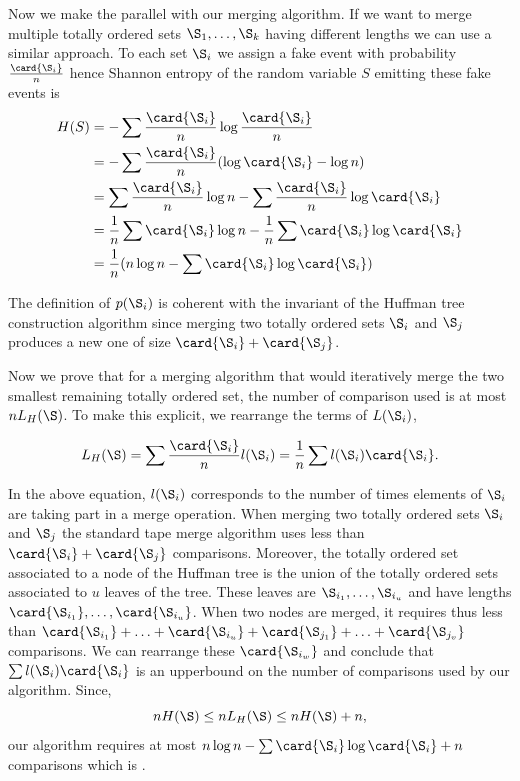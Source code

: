 Now we make the parallel with our merging algorithm. If we want to merge
multiple totally ordered sets \(\S_1,\ldots,\S_k\) having different lengths we can use a similar
approach. To each set \(\S_i\) we assign a fake event with probability
\(\frac{\card{\S_i}}{n}\) hence Shannon entropy of the random variable
\(S\) emitting these fake events is
\begin{align}
H(S) &= - \sum \frac{\card{\S_i}}{n} \log \frac{\card{\S_i}}{n}\\
&= - \sum \frac{\card{\S_i}}{n} (\log \card{\S_i} - \log n)\\
&= \sum \frac{\card{\S_i}}{n} \log n - \sum \frac{\card{\S_i}}{n} \log \card{\S_i}\\
&= \frac{1}{n} \sum \card{\S_i} \log n - \frac{1}{n} \sum \card{\S_i} \log
\card{\S_i}\\
&= \frac{1}{n} (n \log n - \sum \card{\S_i} \log \card{\S_i})\\
\end{align}

The definition of \(p(\S_i)\) is coherent with the invariant of
the Huffman tree construction algorithm since merging two totally ordered sets
\(\S_i\) and \(\S_j\) produces a new one of size \(\card{\S_i} + \card{\S_j}\).

Now we prove that for a merging algorithm that would iteratively merge the two
smallest remaining totally ordered set, the number of comparison used is at
most \(n L_H(\S)\). To make this explicit, we rearrange the terms of \(L(\S_i)\),

\begin{displaymath}
L_H(\S) = \sum \frac{\card{\S_i}}{n} l(\S_i) = \frac{1}{n} \sum l(\S_i) \card{\S_i}.
\end{displaymath}

In the above equation, \(l(\S_i)\) corresponds to the number of times elements
of \(\S_i\) are taking part in a merge operation. When merging two totally
ordered sets \(\S_i\) and \(\S_j\) the standard tape merge algorithm uses less
than \(\card{\S_i} + \card{\S_j}\) comparisons. Moreover, the totally ordered set
associated to a node of the Huffman tree is the union of the totally ordered
sets associated to \(u\) leaves of the tree. These leaves are
\(\S_{i_1},\ldots,\S_{i_u}\) and have lengths
\(\card{\S_{i_1}},\ldots,\card{\S_{i_u}}\). When two nodes are merged, it
requires thus less than
\(\card{\S_{i_1}}+\ldots+\card{\S_{i_u}}+\card{\S_{j_1}}+\ldots+\card{\S_{j_v}}\)
comparisons. We can rearrange these \(\card{\S_{i_w}}\) and conclude that
\(\sum l(\S_i) \card{\S_i}\) is an upperbound on the number of comparisons used
by our algorithm. Since,
\begin{displaymath}
n H(\S) \le n L_H(\S) \le n H(\S) + n,
\end{displaymath}
our algorithm requires at most \(n \log n - \sum \card{\S_i} \log \card{\S_i} +
n\) comparisons which is .

